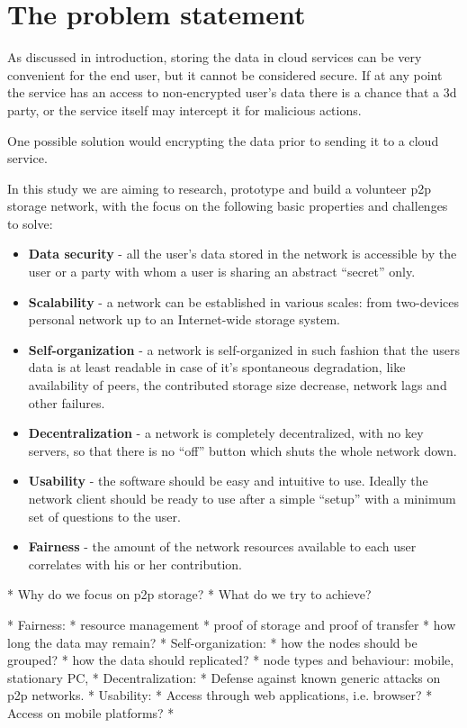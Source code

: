 \section{The problem statement}

As discussed in introduction, storing the data in cloud services
can be very convenient for the end user, but it cannot be considered
secure. If at any point the service has an access to non-encrypted
user's data there is a chance that a 3d party, or the service itself
may intercept it for malicious actions.

One possible solution would encrypting the data prior to sending it
to a cloud service. 

In this study we are aiming to research, prototype and build a volunteer
p2p storage network, with the focus on the following basic properties
and challenges to solve:

\begin{itemize}
\item \textbf{Data security} - all the user's data stored in the network is
  accessible by the user or a party with whom a user is sharing an abstract
  ``secret'' only.
\item \textbf{Scalability} - a network can be established in various
  scales: from two-devices personal network up to an Internet-wide storage
  system.
\item \textbf{Self-organization} - a network is self-organized in such
  fashion that the users data is at least readable in case of it's spontaneous
  degradation, like availability of peers, the contributed storage size
  decrease, network lags and other failures.
\item \textbf{Decentralization} - a network is completely decentralized,
  with no key servers, so that there is no ``off'' button which shuts the
  whole network down.
\item \textbf{Usability} - the software should be easy and intuitive to
  use. Ideally the network client should be ready to use after a  simple
  ``setup'' with a minimum set of questions to the user.
\item \textbf{Fairness} - the amount of the network resources available
  to each user correlates with his or her contribution.
\end{itemize}


* Why do we focus on p2p storage?
* What do we try to achieve?

* Fairness:
  * resource management
  * proof of storage and proof of transfer
  * how long the data may remain? 
* Self-organization:
  * how the nodes should be grouped? 
  * how the data should replicated?
  * node types and behaviour: mobile, stationary PC,
* Decentralization:
  * Defense against known generic attacks on p2p networks.
* Usability:
  * Access through web applications, i.e. browser?
  * Access on mobile platforms?
  * 


